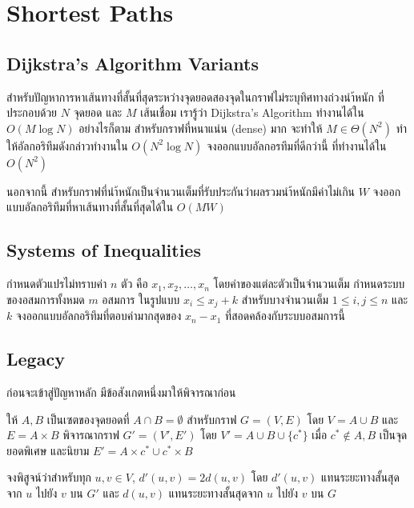 \chapter{Shortest Paths}

\section{Dijkstra's Algorithm Variants}

\begin{exercise}
สำหรับปัญหาการหาเส้นทางที่สั้นที่สุดระหว่างจุดยอดสองจุดในกราฟไม่ระบุทิศทางถ่วงนำ้หนัก ที่ประกอบด้วย $N$ จุดยอด และ $M$ เส้นเชื่อม เรารู้ว่า Dijkstra's Algorithm ทำงานได้ใน $O(M \log N)$ อย่างไรก็ตาม สำหรับกราฟที่หนาแน่น (dense) มาก จะทำให้ $M \in \Theta(N^2)$ ทำให้อัลกอริทึมดังกล่าวทำงานใน $O(N^2 \log N)$ จงออกแบบอัลกอรทึมที่ดีกว่านี้ ที่ทำงานได้ใน $O(N^2)$
\end{exercise}

\begin{exercise}
นอกจากนี้ สำหรับกราฟที่นำ้หนักเป็นจำนวนเต็มที่รับประกันว่าผลรวมนำ้หนักมีค่าไม่เกิน $W$ จงออกแบบอัลกอริทึมที่หาเส้นทางที่สั้นที่สุดได้ใน $O(MW)$
\end{exercise}

\section{Systems of Inequalities}

\begin{exercise}
กำหนดตัวแปรไม่ทราบค่า $n$ ตัว คือ $x_1, x_2, \dots, x_n$ โดยค่าของแต่ละตัวเป็นจำนวนเต็ม กำหนดระบบของอสมการทั้งหมด $m$ อสมการ ในรูปแบบ $x_i \leq x_j + k$ สำหรับบางจำนวนเต็ม $1 \leq i, j \leq n$ และ $k$ จงออกแบบอัลกอริทึมที่ตอบค่ามากสุดของ $x_n - x_1$ ที่สอดคล้องกับระบบอสมการนี้
\end{exercise}

\section{Legacy}
\label{codeforces:786B}

ก่อนจะเข้าสู่ปัญหาหลัก มีข้อสังเกตหนึ่งมาให้พิจารณาก่อน

\begin{exercise}
ให้ $A, B$ เป็นเซตของจุดยอดที่ $A \cap B = \emptyset$ สำหรับกราฟ $G = (V, E)$ โดย $V = A \cup B$ และ $E = A \times B$ พิจารณากราฟ $G' = (V', E')$ โดย $V' = A \cup B \cup \{c^*\}$ เมื่อ $c^* \notin A, B$ เป็นจุดยอดพิเศษ และนิยาม $E' = A \times c^* \cup c^* \times B$

จงพิสูจน์ว่าสำหรับทุก $u, v \in V$, $d'(u, v) = 2d(u, v)$ โดย $d'(u, v)$ แทนระยะทางสั้นสุดจาก $u$ ไปยัง $v$ บน $G'$ และ $d(u, v)$ แทนระยะทางสั้นสุดจาก $u$ ไปยัง $v$ บน $G$
\end{exercise}

